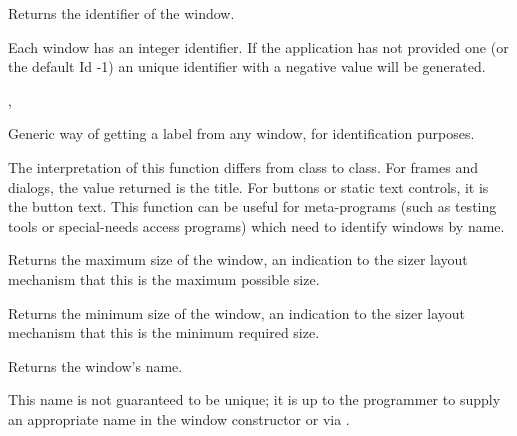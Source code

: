 \label{wxwindowgetid}


Returns the identifier of the window.


Each window has an integer identifier. If the application has not provided one
(or the default Id -1) an unique identifier with a negative value will be generated.


,\rtfsp
{}


\label{wxwindowgetlabel}


Generic way of getting a label from any window, for
identification purposes.


The interpretation of this function differs from class to class.
For frames and dialogs, the value returned is the title. For buttons or static text controls, it is
the button text. This function can be useful for meta-programs (such as testing
tools or special-needs access programs) which need to identify windows
by name.

\label{wxwindowgetmaxsize}


Returns the maximum size of the window, an indication to the sizer layout mechanism
that this is the maximum possible size.

\label{wxwindowgetminsize}


Returns the minimum size of the window, an indication to the sizer layout mechanism
that this is the minimum required size.

\label{wxwindowgetname}


Returns the window's name.


This name is not guaranteed to be unique; it is up to the programmer to supply an appropriate
name in the window constructor or via .


